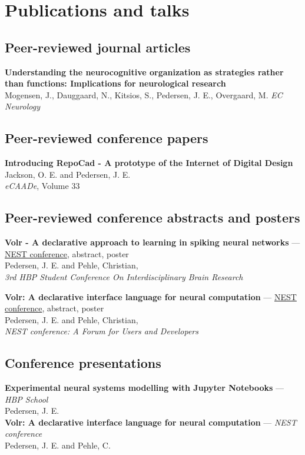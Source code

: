 \documentclass[11pt, a4paper]{article}
\newcommand{\years}[1]{\marginnote{\scriptsize #1}}
\begin{document}
\section*{Publications and talks}
\noindent

\subsection*{Peer-reviewed journal articles}
\years{2018}\textbf{Understanding the neurocognitive organization as strategies rather
than functions: Implications for neurological research}\\
Mogensen, J., Dauggaard, N., Kitsios, S., Pedersen, J. E., Overgaard, M.
\emph{EC Neurology}

\subsection*{Peer-reviewed conference papers}
\years{2015}\textbf{Introducing RepoCad - A prototype of the Internet of Digital
Design}\\
Jackson, O. E. and Pedersen, J. E.\\
\emph{eCAADe}, Volume 33

\subsection*{Peer-reviewed conference abstracts and posters}
\years{2019}\textbf{Volr - A declarative approach to learning in spiking neural networks} 
--- \href{https://education.humanbrainproject.eu/web/3rd-hbp-student-conference}{NEST
conference}, abstract, poster\\
Pedersen, J. E. and Pehle, Christian,\\
\emph{3rd HBP Student Conference On Interdisciplinary Brain Research}

\years{2018}\textbf{Volr: A declarative interface language for neural computation}
--- \href{https://indico-jsc.fz-juelich.de/event/71/}{NEST
conference}, abstract, poster\\
Pedersen, J. E. and Pehle, Christian,\\
\emph{NEST conference: A Forum for Users and Developers}

\subsection*{Conference presentations}
\years{2018}\textbf{Experimental neural systems modelling with Jupyter
Notebooks} ---
\emph{HBP School} \\
Pedersen, J. E. \\[0.4cm]
\years{2018}\textbf{Volr: A declarative interface language for neural
computation}
--- \emph{NEST conference}\\
Pedersen, J. E. and Pehle, C. 
\end{document}
